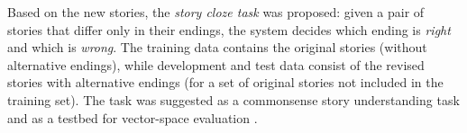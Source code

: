 \documentclass[11pt,a4paper]{article}
\newcommand{\com}[1]{}
\newcommand{\resolved}[1]{}
\newcommand{\shortv}[1]{}
\newcommand{\roy}[1]{{\color{orange}\textsc{[#1 --rs]}}}
\renewcommand{\roy}[1]{{\color{orange}[#1 --rs]}}
\renewcommand{\roy}[1]{#1}
\begin{document}
Based on the new stories, \shortv{\citet{Mostafazadeh:2016} proposed }the {\it story cloze task} was proposed\shortv{. 
The task is simple}:  given a pair of stories that differ only in their endings, the system decides which ending is {\it right} and which is {\it wrong}. 
The \shortv{official }training data contains  the original stories (without alternative endings), while development and test data consist of the revised stories with alternative endings (for a \shortv{different }set of original stories not included in the training set).\resolved{\roy{added {\it not} here}}
The task was suggested as \shortv{an extensive evaluation framework:
as }a commonsense story understanding task\com{, 
as the shared task for the  Linking Models of Lexical, Sentential and Discourse-level Semantics workshop (LSDSem 2017),} and as a testbed for vector-space evaluation \cite{mostafazadeh2016story}.
\end{document}
